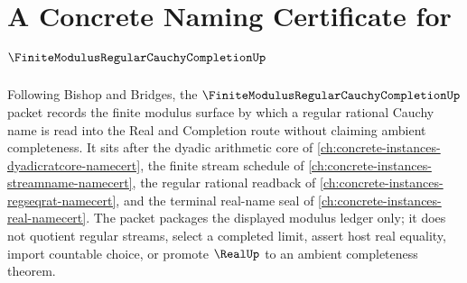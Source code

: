 \chapter{A Concrete Naming Certificate for $\FiniteModulusRegularCauchyCompletionUp$}
\label{ch:concrete-instances-finite-modulus-regular-cauchy-completion-namecert}

Following Bishop and Bridges, the $\FiniteModulusRegularCauchyCompletionUp$ packet records the finite modulus surface by which a regular rational Cauchy name is read into the Real and Completion route without claiming ambient completeness. It sits after the dyadic arithmetic core of \autoref{ch:concrete-instances-dyadicratcore-namecert}, the finite stream schedule of \autoref{ch:concrete-instances-streamname-namecert}, the regular rational readback of \autoref{ch:concrete-instances-regseqrat-namecert}, and the terminal real-name seal of \autoref{ch:concrete-instances-real-namecert}. The packet packages the displayed modulus ledger only; it does not quotient regular streams, select a completed limit, assert host real equality, import countable choice, or promote $\RealUp$ to an ambient completeness theorem.

